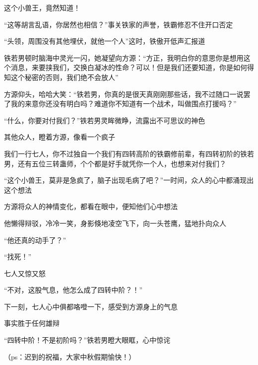 \begin{this_body}
这个小兽王，竟然知道！

“这等胡言乱语，你居然也相信？”事关铁家的声誉，铁霸修忍不住开口否定

“头领，周围没有其他埋伏，就他一个人”这时，铁傲开低声汇报道

铁若男顿时脑海中灵光一闪，她凝望向方源：“方正，我明白你的意思你是想用这个消息，来要挟我们，交换白凝冰的性命？可以！但是我们还要知道，你是如何得知这个秘密的否则，我们绝不会放人”

方源仰头，哈哈大笑：“铁若男，你真的是很天真刚刚那些话，我不过随口一说罢了我的来意你还没有明白吗？难道你不知道有一个战术，叫做围点打援吗？”

“什么，你要对付我们？”铁若男灵眸微睁，流露出不可思议的神色

其他众人，瞪着方源，像看一个疯子

我们一行七人，你不过独自一个我们有四转高阶的铁霸修前辈，有四转初阶的铁若男，还有五位三转蛊师，个个都是好手就凭你一个人，也想来对付我们？

“这个小兽王，莫非是急疯了，脑子出现毛病了吧？”一时间，众人的心中都涌现出这个想法

方源将众人的神情变化，都看在眼中，便知他们心中想法

他懒得辩驳，冷冷一笑，身影倏地凌空飞下，向一头苍鹰，猛地扑向众人

“他还真的动手了？”

“找死！”

七人又惊又怒

“不对，这股气息，他怎么成了四转中阶？！”

下一刻，七人心中俱都咯噔一下，感受到方源身上的气息

事实胜于任何雄辩

“四转中阶！不是初阶吗？”铁若男瞪大眼眶，心中惊诧

（ps：迟到的祝福，大家中秋假期愉快！）

\end{this_body}

